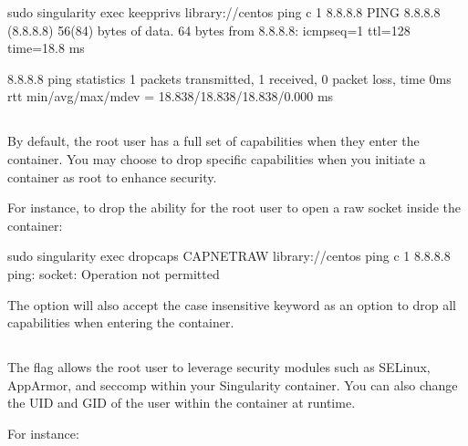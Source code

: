\documentclass[letterpaper,10pt,english]{sphinxmanual}
\begin{document}
%
\begin{sphinxVerbatim}[commandchars=\\\{\}]
\PYGZdl{} sudo singularity exec \PYGZhy{}\PYGZhy{}keep\PYGZhy{}privs library://centos ping \PYGZhy{}c 1 8.8.8.8
PING 8.8.8.8 (8.8.8.8) 56(84) bytes of data.
64 bytes from 8.8.8.8: icmp\PYGZus{}seq=1 ttl=128 time=18.8 ms

\PYGZhy{}\PYGZhy{}\PYGZhy{} 8.8.8.8 ping statistics \PYGZhy{}\PYGZhy{}\PYGZhy{}
1 packets transmitted, 1 received, 0\PYGZpc{} packet loss, time 0ms
rtt min/avg/max/mdev = 18.838/18.838/18.838/0.000 ms
\end{sphinxVerbatim}


\subsection{}
\label{\detokenize{security_options:drop-caps}}
By default, the root user has a full set of capabilities when they enter the
container. You may choose to drop specific capabilities when you initiate a
container as root to enhance security.

For instance, to drop the ability for the root user to open a raw socket inside
the container:

%
\begin{sphinxVerbatim}[commandchars=\\\{\}]
\PYGZdl{} sudo singularity exec \PYGZhy{}\PYGZhy{}drop\PYGZhy{}caps CAP\PYGZus{}NET\PYGZus{}RAW library://centos ping \PYGZhy{}c 1 8.8.8.8
ping: socket: Operation not permitted
\end{sphinxVerbatim}

The  option will also accept the case insensitive keyword 
as an option to drop all capabilities when entering the container.


\subsection{}
\label{\detokenize{security_options:security}}
The  flag allows the root user to leverage security modules such
as SELinux, AppArmor, and seccomp within your Singularity container. You can
also change the UID and GID of the user within the container at runtime.

For instance:
\end{document}
